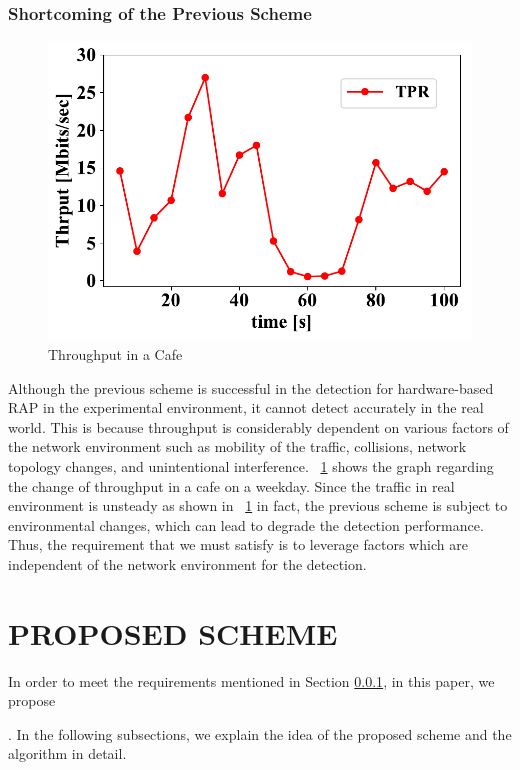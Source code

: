 \documentclass[conference]{IEEEtran}
\begin{document}
\subsubsection{Shortcoming of the Previous Scheme}\label{sec:shortcoming}
\begin{figure}[t]
    \begin{center}
        \includegraphics[scale=0.5]{figure/Thrput.pdf}
        \caption{Throughput in a Cafe}
        \label{thrput}
    \end{center}
\end{figure}

Although the previous scheme is successful in the detection for hardware-based RAP in the experimental environment, it cannot detect accurately in the real world.
This is because throughput is considerably dependent on various factors of the network environment such as mobility of the traffic, collisions, network topology changes, and unintentional interference.
\figurename~\ref{thrput} shows the graph regarding the change of throughput in a cafe on a weekday.
Since the traffic in real environment is unsteady as shown in \figurename~\ref{thrput} in fact, the previous scheme is subject to environmental changes, which can lead to degrade the detection performance.
Thus, the requirement that we must satisfy is to leverage factors which are independent of the network environment for the detection.

\section{PROPOSED SCHEME}\label{sec:4}
In order to meet the requirements mentioned in Section \ref{sec:shortcoming}, in this paper, we propose \title{}.
In the following subsections, we explain the idea of the proposed scheme and the algorithm in detail.
\end{document}
